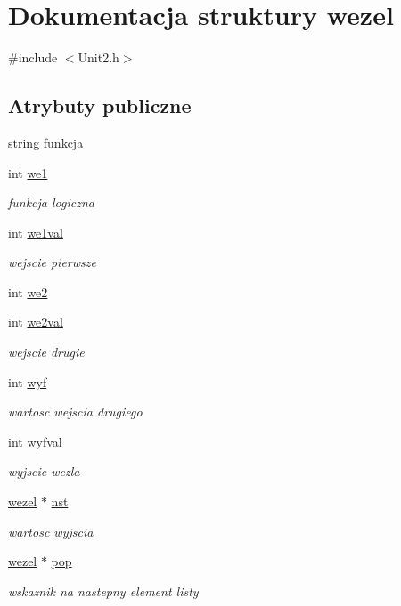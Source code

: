\hypertarget{structwezel}{}\section{Dokumentacja struktury wezel}
\label{structwezel}


{\ttfamily \#include $<$Unit2.\+h$>$}

\subsection*{Atrybuty publiczne}
\begin{DoxyCompactItemize}
\item 
string \mbox{\hyperlink{structwezel_a148a644d01c3a8901d86c5b2a3d8537e}{funkcja}}
\item 
int \mbox{\hyperlink{structwezel_a5f77c2d18eb7ef9a6cc0ec4db11a0530}{we1}}
\begin{DoxyCompactList}\small\item\em funkcja logiczna \end{DoxyCompactList}\item 
int \mbox{\hyperlink{structwezel_a7482d46998d0b6b95349e0a40c986910}{we1val}}
\begin{DoxyCompactList}\small\item\em wejscie pierwsze \end{DoxyCompactList}\item 
int \mbox{\hyperlink{structwezel_a39e4484f5cbc1b01af8ba76af636dec5}{we2}}
\item 
int \mbox{\hyperlink{structwezel_a6b8efbe6f900d1bcd8bdc83a0ca304fd}{we2val}}
\begin{DoxyCompactList}\small\item\em wejscie drugie \end{DoxyCompactList}\item 
int \mbox{\hyperlink{structwezel_a23422c8c9e922d11f894414788b881aa}{wyf}}
\begin{DoxyCompactList}\small\item\em wartosc wejscia drugiego \end{DoxyCompactList}\item 
int \mbox{\hyperlink{structwezel_a194a323b0da80cd204f98ccc5946167b}{wyfval}}
\begin{DoxyCompactList}\small\item\em wyjscie wezla \end{DoxyCompactList}\item 
\mbox{\hyperlink{structwezel}{wezel}} $\ast$ \mbox{\hyperlink{structwezel_aabe580e837a6da48ce1f49fcc7438372}{nst}}
\begin{DoxyCompactList}\small\item\em wartosc wyjscia \end{DoxyCompactList}\item 
\mbox{\hyperlink{structwezel}{wezel}} $\ast$ \mbox{\hyperlink{structwezel_ab2eaee46825e632254db79066ad6821c}{pop}}
\begin{DoxyCompactList}\small\item\em wskaznik na nastepny element listy \end{DoxyCompactList}\end{DoxyCompactItemize}


